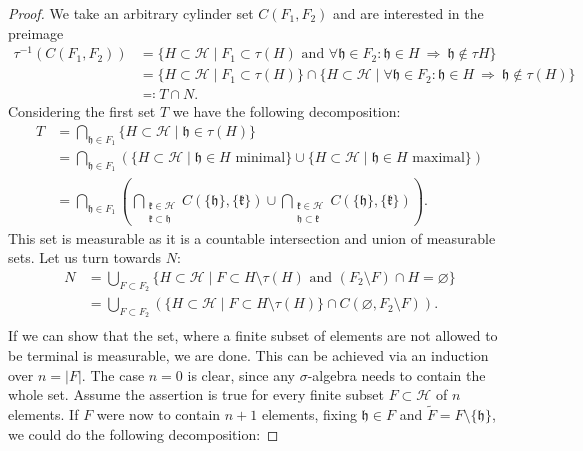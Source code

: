 \begin{proof}
  We take an arbitrary cylinder set \(C(F_1, F_2)\) and are interested in the preimage
  \begin{align*}
    \tau^{-1}(C(F_1, F_2))
    & = \{H \subset \mathcal{H} \mid F_1 \subset \tau(H) \text{ and } \forall \mathfrak{h} \in F_2\colon \mathfrak{h} \in H\ \Rightarrow\ \mathfrak{h} \not\in \tau{H}\} \\
    & = \{H \subset \mathcal{H} \mid F_1 \subset \tau(H)\} \cap \{H \subset \mathcal{H} \mid \forall \mathfrak{h} \in F_2\colon \mathfrak{h} \in H\ \Rightarrow\ \mathfrak{h} \not\in \tau(H)\}\\
    & \eqqcolon T \cap N.
  \end{align*}
  Considering the first set \(T\) we have the following decomposition:
  \begin{align*}
    T
    & = \bigcap_{\mathfrak{h} \in F_1}\{H \subset \mathcal{H} \mid \mathfrak{h} \in \tau(H)\}\\
    & = \bigcap_{\mathfrak{h} \in F_1}\left (\{H \subset \mathcal{H} \mid \mathfrak{h} \in H \text{ minimal}\} \cup \{H \subset \mathcal{H} \mid \mathfrak{h} \in H \text{ maximal}\}\right )\\
    & = \bigcap_{\mathfrak{h} \in F_1}\left ( \bigcap_{\substack{\mathfrak{k} \in \mathcal{H}\\\mathfrak{k} \subset \mathfrak{h}}}C(\{\mathfrak{h}\}, \{\mathfrak{k}\}) \cup \bigcap_{\substack{\mathfrak{k} \in \mathcal{H}\\\mathfrak{h} \subset\mathfrak{k}}} C(\{\mathfrak{h}\}, \{\mathfrak{k}\})\right ).
  \end{align*}
  This set is measurable as it is a countable intersection and union of measurable sets. Let us turn towards \(N\):
  \begin{align*}
    N
    & = \bigcup_{F \subset F_2} \{H \subset \mathcal{H} \mid F \subset H \setminus \tau(H) \text{ and } (F_2 \setminus F) \cap H = \varnothing\}\\
    & = \bigcup_{F \subset F_2} \left ( \{H \subset \mathcal{H} \mid F \subset H \setminus \tau(H)\} \cap C(\varnothing, F_2 \setminus F)\right).\\
  \end{align*}
  If we can show that the set, where a finite subset of elements are not allowed to be terminal is measurable, we are done. This can be achieved via an induction over \(n = |F|\). The case \(n = 0\) is clear, since any \(\sigma\)-algebra needs to contain the whole set. Assume the assertion is true for every finite subset \(F \subset \mathcal{H}\) of \(n\) elements. If \(F\) were now to contain \(n+1\) elements, fixing \(\mathfrak{h} \in F\) and \(\tilde F = F \setminus \{\mathfrak{h}\}\), we could do the following decomposition:

\end{proof}
